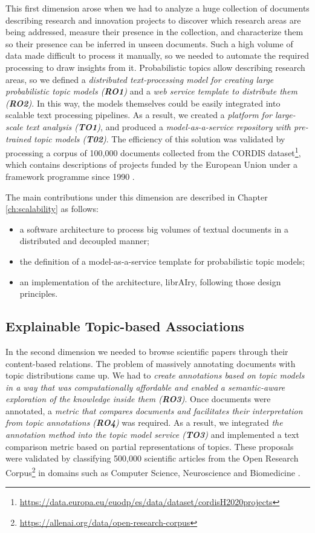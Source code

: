 This first dimension arose when we had to analyze a huge collection of documents describing research and innovation projects to discover which research areas are being addressed, measure their presence in the collection, and characterize them so their presence can be inferred in unseen documents. Such a high volume of data made difficult to process it manually, so we needed to automate the required processing to draw insights from it. Probabilistic topics allow describing research areas, so we defined a \textit{distributed text-processing model for creating large probabilistic topic models (\textbf{RO1})} and a \textit{web service template to distribute them (\textbf{RO2})}. In this way, the models themselves could be easily integrated into scalable text processing pipelines. As a result, we created a \textit{platform for large-scale text analysis (\textbf{TO1})}, and produced a \textit{model-as-a-service repository with pre-trained topic models (\textbf{T02})}. The efficiency of this solution was validated by processing a corpus of 100,000 documents collected from the CORDIS dataset\footnote{\url{https://data.europa.eu/euodp/es/data/dataset/cordisH2020projects}}, which contains descriptions of projects funded by the European Union under a framework programme since 1990 \citep{Badenes-Olmedo2017}. 

The main contributions under this dimension are described in Chapter \ref{ch:scalability} as follows:
\begin{itemize}
\item a software architecture to process big volumes of textual documents in a distributed and decoupled manner;
\item the definition of a model-as-a-service template for probabilistic topic models;
\item an implementation of the architecture, librAIry, following those design principles.
\end{itemize} 


\subsection{Explainable Topic-based Associations}

In the second dimension we needed to browse scientific papers through their content-based relations. The problem of massively annotating documents with topic distributions came up. We had to \textit{create annotations based on topic models in a way that was computationally affordable and enabled a semantic-aware exploration of the knowledge inside them (\textbf{RO3})}. Once documents were annotated, a \textit{metric that compares documents and facilitates their interpretation from topic annotations (\textbf{RO4})} was required. As a result, we integrated \textit{the annotation method into the topic model service (\textbf{TO3})} and implemented a text comparison metric based on partial representations of topics. These proposals were validated by classifying 500,000 scientific articles from the Open Research Corpus\footnote{\url{https://allenai.org/data/open-research-corpus}} in domains such as Computer Science, Neuroscience and Biomedicine \citep{Badenes-Olmedo2017b, Badenes-Olmedo2017c, Badenes-Olmedo2019b}. 

